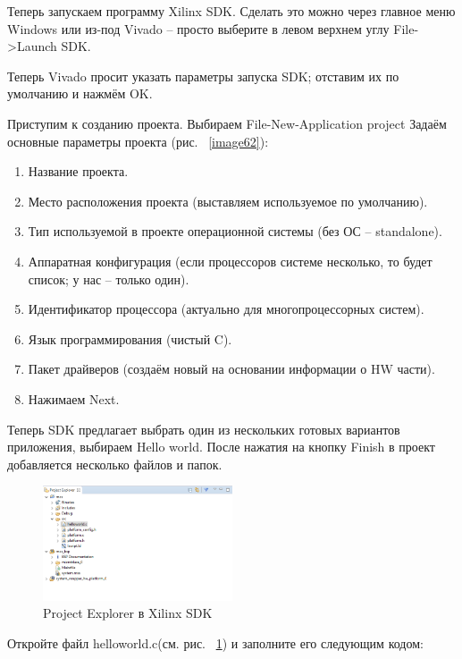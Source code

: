 \documentclass[a4paper,oneside ,14pt]{extreport}
\begin{document}
Теперь запускаем программу Xilinx SDK. Сделать это можно через главное 
меню Windows или из-под Vivado – просто выберите в левом верхнем углу File->Launch SDK.

Теперь Vivado просит указать параметры запуска SDK; отставим их по 
умолчанию и нажмём OK.

Приступим к созданию проекта. Выбираем File-New-Application project
Задаём основные параметры проекта (рис. ~\ref{image62}):

\begin{enumerate}
	\item Название проекта.
	\item Место расположения проекта (выставляем используемое по 
умолчанию).
	\item Тип используемой в проекте операционной системы (без ОС –
standalone).
	\item Аппаратная конфигурация (если процессоров системе несколько, то 
будет список; у нас – только один).
	\item Идентификатор процессора (актуально для многопроцессорных систем).
	\item Язык программирования (чистый C).
	\item Пакет драйверов (создаём новый на основании информации о HW части).
	\item Нажимаем Next.
\end{enumerate}

Теперь SDK предлагает выбрать один из нескольких готовых вариантов 
приложения, выбираем Hello world. После нажатия на кнопку Finish в 
проект добавляется несколько файлов и папок.

\begin{figure}[!ht]
	\centering
	\includegraphics[width=0.5\textwidth]{image/SDK_Exp.png}
	\caption{Project Explorer в Xilinx SDK}
	\label{SDK_Exp}
\end{figure}

Откройте файл helloworld.c(см. рис. ~\ref{SDK_Exp}) и заполните его следующим кодом:
\end{document}
